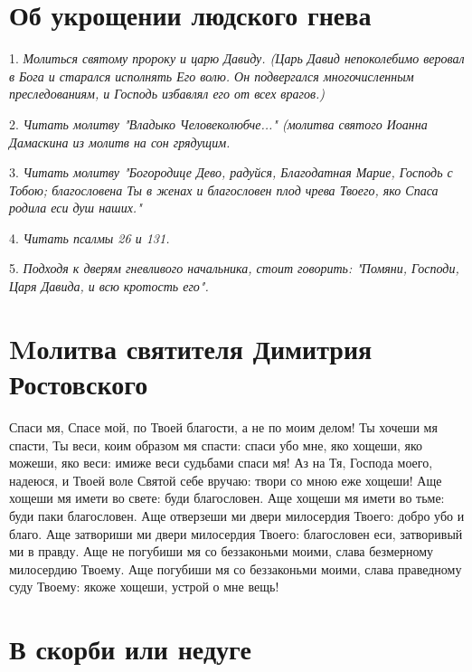 \section{Об укрощении людского гнева}
 


1. \itshape Молиться святому пророку и царю Давиду. (Царь Давид непоколебимо веровал в Бога и старался исполнять Его волю. Он подвергался многочисленным преследованиям, и Господь избавлял его от всех врагов.)\normalfont{}

2. \itshape Читать молитву\normalfont{} "Владыко Человеколюбче..." (\itshape молитва святого Иоанна Дамаскина из молитв на сон грядущим.\normalfont{}

3. \itshape Читать молитву\normalfont{} "Богородице Дево, радуйся, Благодатная Марие, Господь с Тобою; благословена Ты в женах и благословен плод чрева Твоего, яко Спаса родила еси душ наших."

4. \itshape Читать псалмы 26 и 131.\normalfont{}

5. \itshape Подходя к дверям гневливого начальника, стоит говорить:\normalfont{} "Помяни, Господи, Царя Давида, и всю кротость его".





\section{Mолитва святителя Димитрия Ростовского}
 


Спаси мя, Спасе мой, по Твоей благости, а не по моим делом! Ты хочеши мя спасти, Ты веси, коим образом мя спасти: спаси убо мне, яко хощеши, яко можеши, яко веси: имиже веси судьбами спаси мя! Аз на Тя, Господа моего, надеюся, и Твоей воле Святой себе вручаю: твори со мною еже хощеши! Аще хощеши мя имети во свете: буди благословен. Аще хощеши мя имети во тьме: буди паки благословен. Аще отверзеши ми двери милосердия Твоего: добро убо и благо. Аще затвориши ми двери милосердия Твоего: благословен еси, затворивый ми в правду. Аще не погубиши мя со беззаконьми моими, слава безмерному милосердию Твоему. Аще погубиши мя со беззаконьми моими, слава праведному суду Твоему: якоже хощеши, устрой о мне вещь!


\section{В скорби или недуге}
 



